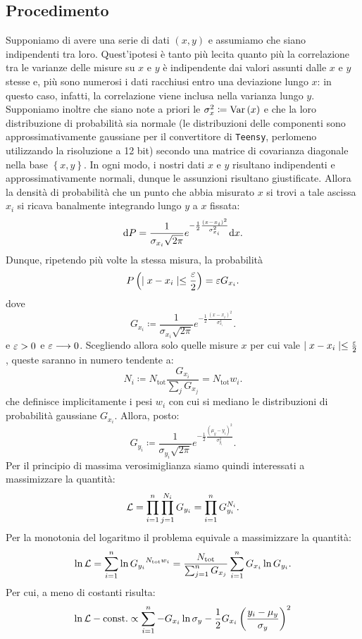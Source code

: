 \documentclass{article}[a4paper, oneside, 11pt]
\begin{document}
\subsection{Procedimento}
Supponiamo di avere una serie di dati $(x, y)$ e assumiamo che siano
indipendenti tra loro. Quest'ipotesi
è tanto più lecita quanto più la correlazione tra le varianze delle misure su
$x$ e $y$ è indipendente dai valori assunti dalle $x$ e $y$ stesse e, più
sono numerosi i dati racchiusi entro una deviazione lungo $x$: in questo caso,
infatti, la correlazione viene inclusa nella varianza lungo $y$.
Supponiamo inoltre che siano note a priori le $\sigma_x ^2 \coloneqq \text{Var}\left(x\right)$
e che la loro distribuzione di probabilità sia normale (le distribuzioni
delle componenti sono approssimativamente gaussiane per il convertitore
di \verb+Teensy+, perlomeno utilizzando la risoluzione a 12 bit) secondo una 
matrice
di covarianza diagonale nella base $\left\{x, y\right\}$.
In ogni modo, i nostri dati $x$ e $y$ risultano indipendenti e
approssimativamente normali, dunque le assunzioni risultano giustificate. 
Allora la densità di probabilità che un punto che abbia misurato $x$ si trovi
a tale ascissa $x_i$ si ricava banalmente integrando lungo $y$ a $x$ fissata:
\[
	\mathrm{d} P = \frac{1}{\sigma_{x_i} \sqrt{2\pi}}
	e^{-\frac{1}{2}{\frac{(x - x_i)^2}{\sigma_{x_i}^2}}} \mathrm{d} x
.\] 
Dunque, ripetendo più volte la stessa misura, la probabilità
\[
	P\left(\mid x - x_i \mid \leq \frac{\varepsilon}{2} \right) = \varepsilon G_{x_i} 
.\]
dove \[
	G_{x_i} \coloneqq \frac{1}{\sigma_{x_i} \sqrt{2\pi}}
	e^{-\frac{1}{2}{\frac{(x - x_i)^2}{\sigma_{x_i}^2}}}
.\] 
e $\varepsilon > 0$ e $\varepsilon \longrightarrow 0$. Scegliendo allora solo quelle misure $x$ per
cui vale $\mid x - x_i \mid \leq \frac{\varepsilon}{2}$, queste saranno in numero
tendente a:
\[
	N_i \coloneqq N_{\text{tot}} \frac{G_{x_i}}{\sum_j G_{x_j}} =
		N_{\text{tot}} w_i
.\] 
che definisce implicitamente i pesi $w_i$ con cui si mediano le distribuzioni
di probabilità gaussiane $G_{x_i}$.
Allora, posto:
\[
	G_{y_i} \coloneqq \frac{1}{\sigma_{y_i} \sqrt{2\pi}}
	e^{-\frac{1}{2}{\frac{(\mu_y - y_i)^2}{\sigma_{y_i}^2}}}
.\] 
Per il principio di massima verosimiglianza siamo quindi interessati a
massimizzare la quantità:
\[
	\mathcal L = \prod_{i=1}^{n} \prod_{j=1}^{N_i} G_{y_i} = 
	\prod_{i=1}^{n} G_{y_i}^{N_i}
.\] 
Per la monotonia del logaritmo il problema equivale a massimizzare la quantità:
\[
	\ln{\mathcal L} = \sum_{i=1}^{n}\ln{G_{y_i}}^{N_{\text{tot}}w_i} = 
	\frac{N_{\text{tot}}} {\sum_{j=1}^{n} G_{x_j}} 
	\sum_{i=1}^{n} G_{x_i} \ln{G_{y_i}}
.\] 
Per cui, a meno di costanti risulta:
\begin{equation}\label{eq: likeconst}
	\ln{\mathcal L} - \text{const.} \propto \sum_{i=1}^{n} -G_{x_i} \ln{\sigma_y}
	- \frac{1}{2} G_{x_i} \left( \frac{y_i - \mu_y}{\sigma_y} \right)^2
\end{equation}
\end{document}
